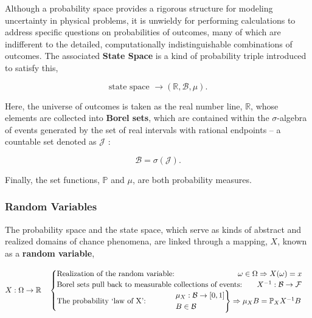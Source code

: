 \documentclass[12pt, twoside, draft]{article}
\begin{document}
Although a probability space provides a rigorous structure for modeling uncertainty in physical problems, it is unwieldy for performing calculations to address specific questions on probabilities of outcomes, many of which are indifferent to the detailed, computationally indistinguishable combinations of outcomes.  The associated \textbf{State Space} is a kind of probability triple introduced to satisfy this,

\begin{equation}
\text{state space } \rightarrow (\mathbb{R}, \mathcal{B}, \mu).
\end{equation}

Here, the  universe of outcomes is taken as the real number line, $\mathbb{R}$, whose elements are collected into \textbf{Borel sets}, which are contained within the $\sigma$-algebra of events generated by the set of real intervals with rational endpoints -- a countable set denoted as $\mathcal{J}$ :

\begin{equation}
\mathcal{B} = \sigma(\mathcal{J}).
\end{equation}

Finally, the set functions, $\mathbb{P}$ and $\mu$, are both probability measures.

\subsubsection{Random Variables}\label{sec:random_variables}

The probability space and the state space, which serve as kinds of abstract and realized domains of chance phenomena, are linked through a mapping, $X$, known as a \textbf{random variable},

\begin{equation}\label{eq:random_variable}
X:\Omega \rightarrow \mathbb{R} \hspace{10pt}
\begin{cases}
\text{Realization of the random variable: }\hspace{79pt} \omega \in \Omega \Rightarrow X(\omega) = x \\
\text{Borel sets pull back to measurable collections of events: }  \hspace{15pt} X^{-1}: \mathcal{B} \rightarrow \mathcal{F} \\
\text{The probability `law of X': } \hspace{33pt} 
\begin{rcases}
\mu_X : \mathcal{B} \rightarrow [0,1] \\
B \in \mathcal{B} 
\end{rcases} \Rightarrow \mu_X B = \mathbb{P}_X X^{-1} B
\end{cases}
\end{equation}
\end{document}
